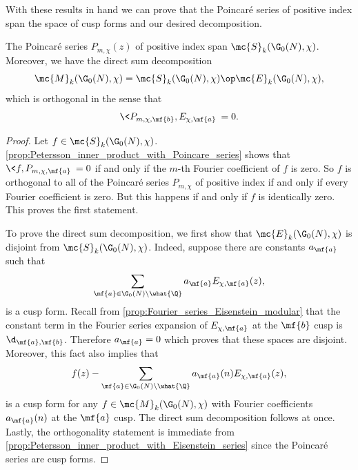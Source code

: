 \documentclass[12pt]{article}
\begin{document}
      With these results in hand we can prove that the Poincar\'e series of positive index span the space of cusp forms and our desired decomposition.

      \begin{theorem}
        The Poincar\'e series \(P_{m,\chi}(z)\) of positive index span \(\mc{S}_{k}(\G_{0}(N),\chi)\). Moreover, we have the direct sum decomposition
        \[
          \mc{M}_{k}(\G_{0}(N),\chi) = \mc{S}_{k}(\G_{0}(N),\chi) \op \mc{E}_{k}(\G_{0}(N),\chi),
        \]
        which is orthogonal in the sense that
        \[
          \<P_{m,\chi,\mf{b}},E_{\chi,\mf{a}}\> = 0.
        \]
      \end{theorem}
      \begin{proof}
        Let \(f \in \mc{S}_{k}(\G_{0}(N),\chi)\). \cref{prop:Petersson_inner_product_with_Poincare_series} shows that \(\<f,P_{m,\chi,\mf{a}}\> = 0\) if and only if the \(m\)-th Fourier coefficient of \(f\) is zero. So \(f\) is orthogonal to all of the Poincar\'e series \(P_{m,\chi}\) of positive index if and only if every Fourier coefficient is zero. But this happens if and only if \(f\) is identically zero. This proves the first statement.

        To prove the direct sum decomposition, we first show that \(\mc{E}_{k}(\G_{0}(N),\chi)\) is disjoint from \(\mc{S}_{k}(\G_{0}(N),\chi)\). Indeed, suppose there are constants \(a_{\mf{a}}\) such that
        \[
          \sum_{\mf{a} \in \G_{0}(N)\backslash\what{\Q}}a_{\mf{a}}E_{\chi,\mf{a}}(z),
        \]
        is a cusp form. Recall from \cref{prop:Fourier_series_Eisenstein_modular} that the constant term in the Fourier series expansion of \(E_{\chi,\mf{a}}\) at the \(\mf{b}\) cusp is \(\d_{\mf{a},\mf{b}}\). Therefore \(a_{\mf{a}} = 0\) which proves that these spaces are disjoint. Moreover, this fact also implies that
        \[
          f(z)-\sum_{\mf{a} \in \G_{0}(N)\backslash\what{\Q}}a_{\mf{a}}(n)E_{\chi,\mf{a}}(z),
        \]
        is a cusp form for any \(f \in \mc{M}_{k}(\G_{0}(N),\chi)\) with Fourier coefficients \(a_{\mf{a}}(n)\) at the \(\mf{a}\) cusp. The direct sum decomposition follows at once. Lastly, the orthogonality statement is immediate from \cref{prop:Petersson_inner_product_with_Eisenstein_series} since the Poincar\'e series are cusp forms.
      \end{proof}
\end{document}
